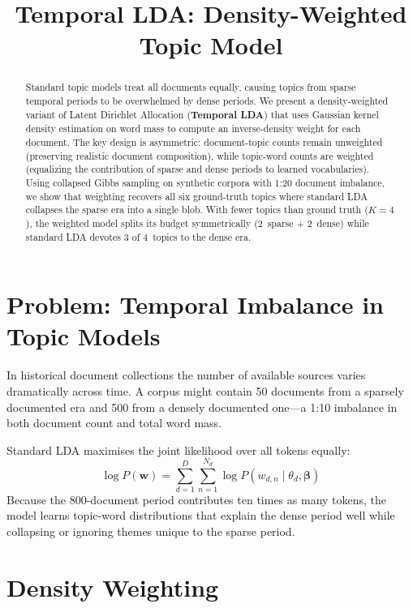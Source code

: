 \documentclass[11pt]{article}
\title{Temporal LDA: Density-Weighted Topic Model}
\author{}
\date{}
\begin{document}
\maketitle

\begin{abstract}
Standard topic models treat all documents equally, causing topics from sparse temporal periods to be overwhelmed by dense periods.
We present a density-weighted variant of Latent Dirichlet Allocation (\textbf{Temporal LDA}) that uses Gaussian kernel density estimation on word mass to compute an inverse-density weight for each document.
The key design is asymmetric: document-topic counts remain unweighted (preserving realistic document composition), while topic-word counts are weighted (equalizing the contribution of sparse and dense periods to learned vocabularies).
Using collapsed Gibbs sampling on synthetic corpora with 1:20 document imbalance, we show that weighting recovers all six ground-truth topics where standard LDA collapses the sparse era into a single blob.
With fewer topics than ground truth ($K=4$), the weighted model splits its budget symmetrically (2~sparse + 2~dense) while standard LDA devotes 3 of 4~topics to the dense era.
\end{abstract}

\section{Problem: Temporal Imbalance in Topic Models}

In historical document collections the number of available sources varies dramatically across time.
A corpus might contain 50 documents from a sparsely documented era and 500 from a densely documented one---a 1:10 imbalance in both document count and total word mass.

Standard LDA maximises the joint likelihood over all tokens equally:
\[
\log P(\mathbf w) = \sum_{d=1}^{D} \sum_{n=1}^{N_d} \log P(w_{d,n} \mid \theta_d, \boldsymbol\beta)
\]
Because the 800-document period contributes ten times as many tokens, the model learns topic-word distributions that explain the dense period well while collapsing or ignoring themes unique to the sparse period.

\section{Density Weighting}
\end{document}
